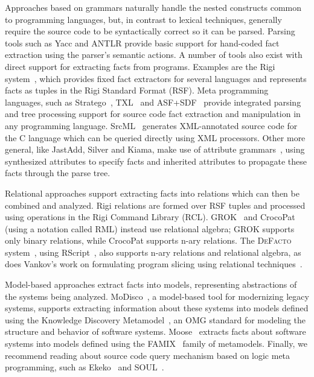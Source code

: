 \documentclass[conference]{IEEEtran}
\newcommand{\Rascal}{\textsc{Rascal}}
\newcommand{\DeFacto}{\textsc{DeFacto}\xspace}
\begin{document}
Approaches based on grammars naturally handle the nested constructs common to
programming languages, but, in contrast to lexical techniques, generally
require the source code to be syntactically correct so it can be parsed.
Parsing tools such as Yacc and ANTLR provide basic support for hand-coded
fact extraction using the parser's semantic actions. A number of tools also
exist with direct support for extracting facts from programs. Examples are
the Rigi system~\cite{Mueller88}, which provides fixed fact extractors for
several languages and represents facts as tuples in the Rigi Standard Format
(RSF). Meta programming languages, such as Stratego~\cite{BKVV06}, TXL~\cite{TXL06} and ASF+SDF~\cite{BDHJJKKMOSVVV01} provide integrated parsing and tree processing support for source code fact extraction and manipulation in any programming language. SrcML~\cite{srcml} generates XML-annotated source code for the C language which can be queried directly using XML processors. Other more general, like JastAdd, Silver and Kiama, make use of attribute
grammars~\cite{FNC2,Paakki95,EkmanHedin07,kiama,DBLP:journals/scp/WykBGK10},
using synthesized attributes to specify facts and inherited attributes to
propagate these facts through the parse tree.

Relational approaches support extracting facts into relations which can then
be combined and analyzed. Rigi relations are formed over RSF tuples and
processed using operations in the Rigi Command Library (RCL).
GROK~\cite{Holt96} and CrocoPat~\cite{BeyerEtAl03,beyer05efficient} (using a
notation called RML) instead use relational algebra; GROK supports only binary
relations, while CrocoPat supports n-ary relations. The \DeFacto
system~\cite{DBLP:conf/sle/BastenK08}, using RScript~\cite{KlintRscript}, also
supports n-ary relations and relational algebra, as does Vankov's work on
formulating program slicing using relational techniques~\cite{Vankov05}.

Model-based approaches extract facts into models, representing abstractions of
the systems being analyzed. MoDisco~\cite{DBLP:journals/infsof/BruneliereCDM14,DBLP:conf/kbse/BruneliereCJM10},
a model-based tool for modernizing legacy
systems, supports extracting information about these systems into models
defined using the Knowledge Discovery Metamodel~\cite{omg-kdm}, an OMG
standard for modeling the structure and behavior of software systems. 
Moose~\cite{DBLP:conf/sigsoft/NierstraszDG05,DBLP:journals/sigsoft/Nierstrasz12}
extracts facts about software systems into models defined using the FAMIX~\cite{famix}
family of metamodels. Finally, we recommend reading about source code query mechanism based on logic meta programming, such as Ekeko~\cite{ekeko} and SOUL~\cite{soul}.
\end{document}

